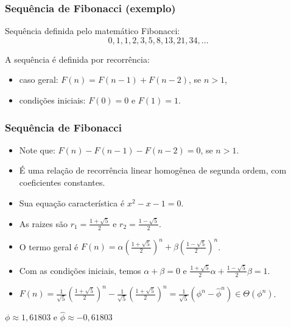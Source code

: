 \documentclass[handout]{beamer}
\begin{document}
\begin{frame}
\frametitle{Sequência de Fibonacci (exemplo)}

Sequência definida pelo matemático Fibonacci:
$$0, 1, 1, 2, 3, 5, 8, 13, 21, 34, \ldots$$

A sequência é definida por recorrência:
\begin{itemize}
\item caso geral: $F(n) = F(n-1) + F(n-2)$, se $n > 1$, 
\item condições iniciais: $F(0) = 0$ e $F(1) = 1$.
\end{itemize}

\end{frame}

\begin{frame}
\frametitle{Sequência de Fibonacci}

\begin{itemize}
\item Note que: $F(n) - F(n-1) - F(n-2) = 0$, se $n > 1$. 

\item É uma relação de recorrência linear homogênea de segunda ordem, com
  coeficientes constantes.

\item Sua equação característica é $x^2 - x - 1 = 0$.

\item As raizes são $r_1 = \frac{1+\sqrt{5}}{2}$ e $r_2 = \frac{1-\sqrt{5}}{2}$.

\item O termo geral é $F(n) = \alpha(\frac{1+\sqrt{5}}{2})^n + \beta(\frac{1-\sqrt{5}}{2})^n$.

\item Com as condições iniciais, temos $\alpha + \beta = 0$ e $\frac{1+\sqrt{5}}{2}\alpha + \frac{1-\sqrt{5}}{2}\beta = 1$.

\item $F(n) = \frac{1}{\sqrt{5}}(\frac{1+\sqrt{5}}{2})^n - \frac{1}{\sqrt{5}}(\frac{1+\sqrt{5}}{2})^n = \frac{1}{\sqrt{5}}(\phi^n - \hat{\phi}^n) \in \Theta(\phi^n)$.
\end{itemize}
$\phi \approx 1,61803$ e $\hat{\phi} \approx - 0,61803$
\end{frame}
\end{document}
